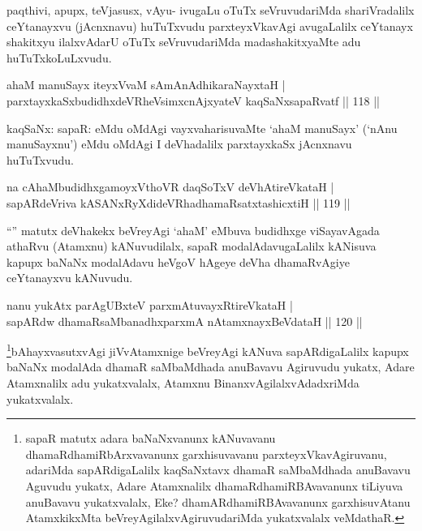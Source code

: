 \begin{artha}
paqthivi, apupx, teVjasusx, vAyu- ivugaLu oTuTx seVruvudariMda shariVradalilx ceYtanayxvu (jAcnxnavu) huTuTxvudu parxteyxVkavAgi avugaLalilx ceYtanayx shakitxyu ilalxvAdarU oTuTx seVruvudariMda madashakitxyaMte adu huTuTxkoLuLxvudu.
\end{artha}


\begin{shl}
ahaM manuSayx iteyxVvaM sAmAnAdhikaraNayxtaH | \\
parxtayxkaSxbudidhxdeVRheV\s simxcnAjxyateV kaqSaNxsapaRvatf \hfill||  118 ||  
\end{shl}

\begin{artha}
kaqSaNx: sapaR: eMdu oMdAgi vayxvaharisuvaMte `ahaM manuSayx' (`nAnu manuSayxnu') eMdu oMdAgi I deVhadalilx parxtayxkaSx jAcnxnavu huTuTxvudu.
\end{artha}

\begin{shl}
na cAhaMbudidhxgamoyxV\s thoVR daqSoTxV deVhAtireVkataH | \\
sapARdeVriva kASANxRyXdideVRhadhamaRsatxtashicxtiH \hfill||  119 ||  
\end{shl}

\begin{artha}
``\stext'' matutx deVhakekx beVreyAgi `ahaM' eMbuva budidhxge viSayavAgada athaRvu (Atamxnu) kANuvudilalx, sapaR modalAdavugaLalilx kANisuva kapupx baNaNx modalAdavu heVgoV hAgeye deVha dhamaRvAgiye ceYtanayxvu kANuvudu.
\end{artha}


\begin{shl}
nanu yukAtx parAgUBxteV parxmAtuvayxRtireVkataH | \\
sapARdw dhamaRsaMbanadhxparxmA nA\s \s tamxnayxBeVdataH \hfill||  120 ||  
\end{shl}

\begin{artha}
\footnote{sapaR matutx adara baNaNxvanunx kANuvavanu dhamaRdhamiRbArxvavanunx garxhisuvavanu parxteyxVkavAgiruvanu, adariMda sapARdigaLalilx kaqSaNxtavx dhamaR saMbaMdhada anuBavavu Aguvudu yukatx, Adare Atamxnalilx dhamaRdhamiRBAvavanunx tiLiyuva anuBavavu yukatxvalalx, Eke? dhamARdhamiRBAvavanunx garxhisuvAtanu AtamxkikxMta beVreyAgilalxvAgiruvudariMda yukatxvalalx veMdathaR.}bAhayxvasutxvAgi jiVvAtamxnige beVreyAgi kANuva sapARdigaLalilx kapupx baNaNx modalAda dhamaR saMbaMdhada anuBavavu Agiruvudu yukatx, Adare Atamxnalilx adu yukatxvalalx, Atamxnu BinanxvAgilalxvAdadxriMda yukatxvalalx.
\end{artha}

